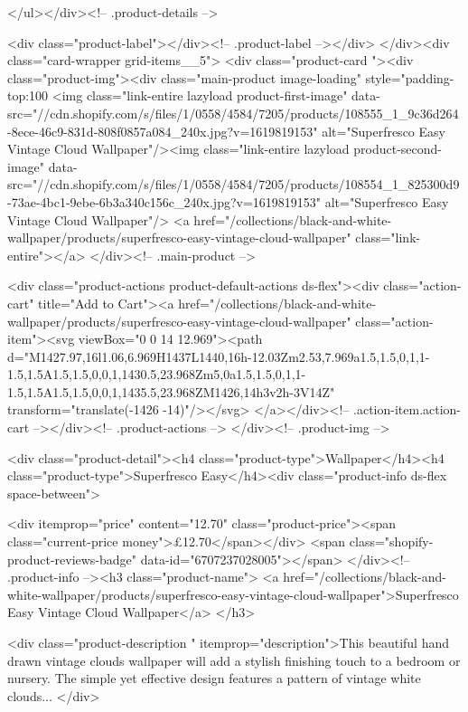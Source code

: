 {{{{{{{      </ul></div><!-- .product-details -->

<div class="product-label"></div><!-- .product-label --></div>
          </div><div class="card-wrapper grid-items__5">
            <div class="product-card "><div class="product-img"><div class="main-product image-loading" style="padding-top:100%
      <img class="link-entire lazyload product-first-image" data-src="//cdn.shopify.com/s/files/1/0558/4584/7205/products/108555_1_9c36d264-8ece-46c9-831d-808f0857a084_240x.jpg?v=1619819153" alt="Superfresco Easy Vintage Cloud Wallpaper"/><img class="link-entire lazyload product-second-image" data-src="//cdn.shopify.com/s/files/1/0558/4584/7205/products/108554_1_825300d9-73ae-4bc1-9ebe-6b3a340c156c_240x.jpg?v=1619819153" alt="Superfresco Easy Vintage Cloud Wallpaper"/>
      <a href="/collections/black-and-white-wallpaper/products/superfresco-easy-vintage-cloud-wallpaper" class="link-entire"></a>
    </div><!-- .main-product -->
  
<div class="product-actions product-default-actions ds-flex"><div class="action-cart" title="Add to Cart"><a href="/collections/black-and-white-wallpaper/products/superfresco-easy-vintage-cloud-wallpaper" class="action-item"><svg viewBox="0 0 14 12.969"><path d="M1427.97,16l1.06,6.969H1437L1440,16h-12.03Zm2.53,7.969a1.5,1.5,0,1,1-1.5,1.5A1.5,1.5,0,0,1,1430.5,23.968Zm5,0a1.5,1.5,0,1,1-1.5,1.5A1.5,1.5,0,0,1,1435.5,23.968ZM1426,14h3v2h-3V14Z" transform="translate(-1426 -14)"/></svg>
</a></div><!-- .action-item.action-cart --></div><!-- .product-actions -->
</div><!-- .product-img -->

<div class="product-detail"><h4 class="product-type">Wallpaper</h4><h4 class="product-type">Superfresco Easy</h4><div class="product-info ds-flex space-between">
    
<div itemprop="price" content="12.70" class="product-price"><span class="current-price money">£12.70</span></div>
    <span class="shopify-product-reviews-badge" data-id="6707237028005"></span>
  </div><!-- .product-info --><h3 class="product-name">
      <a href="/collections/black-and-white-wallpaper/products/superfresco-easy-vintage-cloud-wallpaper">Superfresco Easy Vintage Cloud Wallpaper</a>
    </h3>
    
<div class="product-description " itemprop="description">This beautiful hand drawn vintage clouds wallpaper will add a stylish finishing touch to a bedroom or nursery. The simple yet effective design features a pattern of vintage white clouds...
</div>



}}}}}}}
